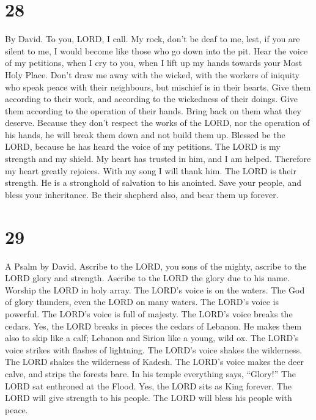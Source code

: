 \hypertarget{section-27}{%
\section{28}\label{section-27}}

By David.  To you, LORD, I call. My rock, don't be deaf to
me, lest, if you are silent to me, I would become like those who go down
into the pit.  Hear the voice of my petitions, when I cry
to you, when I lift up my hands towards your Most Holy Place.
 Don't draw me away with the wicked, with the workers of
iniquity who speak peace with their neighbours, but mischief is in their
hearts.  Give them according to their work, and according
to the wickedness of their doings. Give them according to the operation
of their hands. Bring back on them what they deserve. 
Because they don't respect the works of the LORD, nor the operation of
his hands, he will break them down and not build them up. 
Blessed be the LORD, because he has heard the voice of my petitions.
 The LORD is my strength and my shield. My heart has
trusted in him, and I am helped. Therefore my heart greatly rejoices.
With my song I will thank him.  The LORD is their
strength. He is a stronghold of salvation to his anointed.
 Save your people, and bless your inheritance. Be their
shepherd also, and bear them up forever.

\hypertarget{section-28}{%
\section{29}\label{section-28}}

A Psalm by David.  Ascribe to the LORD, you sons of the
mighty, ascribe to the LORD glory and strength.  Ascribe
to the LORD the glory due to his name. Worship the LORD in holy array.
 The LORD's voice is on the waters. The God of glory
thunders, even the LORD on many waters.  The LORD's voice
is powerful. The LORD's voice is full of majesty.  The
LORD's voice breaks the cedars. Yes, the LORD breaks in pieces the
cedars of Lebanon.  He makes them also to skip like a
calf; Lebanon and Sirion like a young, wild ox.  The
LORD's voice strikes with flashes of lightning.  The
LORD's voice shakes the wilderness. The LORD shakes the wilderness of
Kadesh.  The LORD's voice makes the deer calve, and strips
the forests bare. In his temple everything says, ``Glory!''
 The LORD sat enthroned at the Flood. Yes, the LORD sits
as King forever.  The LORD will give strength to his
people. The LORD will bless his people with peace.

